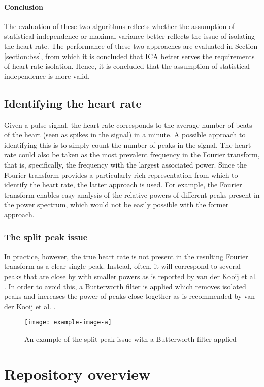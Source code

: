 \paragraph{Conclusion}
The evaluation of these two algorithms reflects whether the assumption of statistical independence or maximal variance better reflects the issue of isolating the heart rate. The performance of these two approaches are evaluated in Section \ref{section:bss}, from which it is concluded that ICA better serves the requirements of heart rate isolation. Hence, it is concluded that the assumption of statistical independence is more valid.
\subsection{Identifying the heart rate}
Given a pulse signal, the heart rate corresponds to the average number of beats of the heart (seen as spikes in the signal) in a minute. A possible approach to identifying this is to simply count the number of peaks in the signal. The heart rate could also be taken as the most prevalent frequency in the Fourier transform, that is, specifically, the frequency with the largest associated power. Since the Fourier transform provides a particularly rich representation from which to identify the heart rate, the latter approach is used. 
For example, the Fourier transform enables easy analysis of the relative powers of different peaks present in the power spectrum, which would not be easily possible with the former approach.

\subsubsection{The split peak issue}
In practice, however, the true heart rate is not present in the resulting Fourier transform as a clear single peak. Instead, often, it will correspond to several peaks that are close by with smaller powers as is reported by van der Kooij et al. \cite{vanderKooij2019}. In order to avoid this, a Butterworth filter is applied which removes isolated peaks and increases the power of peaks close together as is recommended by van der Kooij et al. \cite{vanderKooij2019}.
\begin{figure}[H]
    \texttt{[image: example-image-a]}
   \caption{An example of the split peak issue with a Butterworth filter applied} 
\end{figure}

\section{Repository overview}
